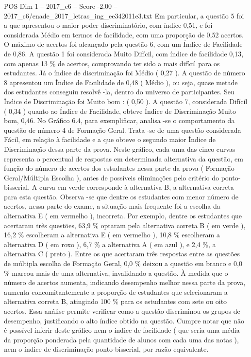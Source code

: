 \begin{textsample}{POS Dim 1 – 2017\_c6 – Score -2.00 – 2017\_c6/enade\_2017\_letras\_ing\_ee342011e3.txt}
Em particular, a questão 5 foi a que apresentou o maior poder discriminatório, com índice 0,51, e foi considerada Médio em termos de facilidade, com uma proporção de 0,52 acertos.
O máximo de acertos foi alcançado pela questão 6, com um Índice de Facilidade de 0,86.
A questão 1 foi considerada Muito Difícil, com índice de facilidade 0,13, com apenas 13 \% de acertos, comprovando ter sido a mais difícil para os estudantes.
Já o índice de discriminação foi Médio ( 0,27 ).
A questão de número 8 apresentou um Índice de Facilidade de 0,48 ( Médio ), ou seja, quase metade dos estudantes conseguiu resolvê -la, dentro do universo de participantes.
Seu Índice de Discriminação foi Muito bom : ( 0,50 ).
A questão 7, considerada Difícil ( 0,34 ) quanto ao Índice de Facilidade, obteve Índice de Discriminação Muito bom, 0,46.
No Gráfico 6.4, para exemplificar, analisa -se o comportamento da questão de número 4 de Formação Geral.
Trata -se de uma questão considerada Fácil, em relação à facilidade e a que obteve o segundo maior Índice de Discriminação dessa parte da prova.
Neste gráfico, cada uma das cinco curvas representa o percentual de respostas em determinada alternativa da questão, em função do número de acertos dos estudantes nessa parte da prova ( Formação Geral/Múltipla Escolha ), antes de possíveis eliminações pelo critério do ponto-bisserial.
A curva em verde corresponde à alternativa B, a alternativa correta para esta questão.
Observa -se que dentre os estudantes com menor número de acertos, nessa parte do exame, a situação mais frequente foi a escolha da alternativa E ( em vermelho ), incorreta.
Por exemplo, dentre os estudantes que acertaram três questões, 63,9 \% optaram pela alternativa correta B ( em verde ), 16,2 \% escolheram a alternativa E ( em vermelho ), 10,8 \% escolheram a alternativa D ( em roxo ), 6,7 \% a alternativa A ( em azul ), e 2,4 \%, a alternativa C ( preto ).
Entre os que acertaram três respostas entre as questões de múltipla escolha de Formação Geral, 0,0 \% deixou a questão em branco e 0,0 \% marcou mais de uma alternativa, invalidando a questão.
À medida que o número de acertos aumenta, indicando desempenho melhor nessa parte da prova, aumenta concomitantemente a proporção de estudantes que selecionaram a alternativa correta B, atingindo 100 \% para os estudantes com sete ou oito acertos.
Essa análise permite verificar como a questão discriminou os grupos de desempenho, justificando o alto índice obtido na questão.
Cumpre notar que não é possível inferir deste gráfico nem o índice de facilidade ( que seria uma média da proporção ponderada pela quantidade de alunos com cada uma das notas ), nem o índice de discriminação ponto-bisserial, por razão equivalente.

\end{textsample}
